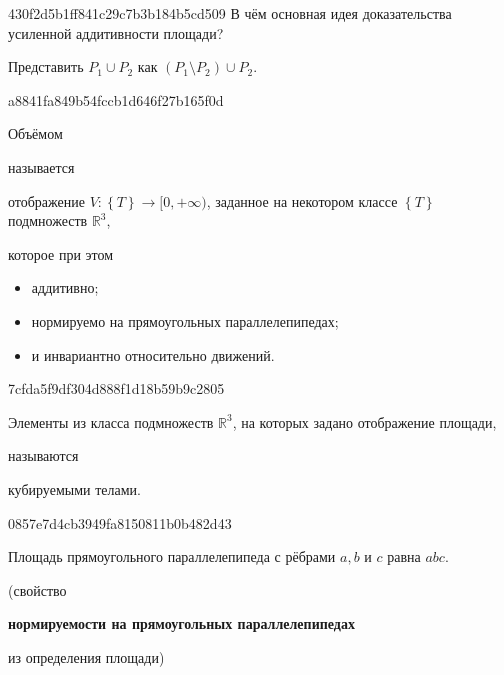 \begin{note}{430f2d5b1ff841c29c7b3b184b5cd509}
    В чём основная идея доказательства усиленной аддитивности площади?

    \begin{cloze}{1}
        Представить \({ P_1 \cup P_2 }\) как \({ (P_1 \setminus P_2) \cup P_2 }\).
    \end{cloze}
\end{note}


\begin{note}{a8841fa849b54fccb1d646f27b165f0d}
    \begin{icloze}{3}Объёмом\end{icloze} называется \begin{icloze}{1}отображение \({ V : \left\{ T \right\} \to [0, +\infty) }\), заданное на некотором классе \({ \left\{ T \right\} }\) подмножеств \({ \mathbb R^3 }\),\end{icloze} которое при этом
    \begin{icloze}{2}
        \begin{itemize}
            \item аддитивно;
            \item нормируемо на прямоугольных параллелепипедах;
            \item и инвариантно относительно движений.
        \end{itemize}
    \end{icloze}
\end{note}

\begin{note}{7cfda5f9df304d888f1d18b59b9c2805}
    \begin{icloze}{2}Элементы из класса подмножеств \({ \mathbb R^3 }\), на которых задано отображение площади,\end{icloze} называются \begin{icloze}{1}кубируемыми телами.\end{icloze}
\end{note}

\begin{note}{0857e7d4cb3949fa8150811b0b482d43}
    \begin{icloze}{1}Площадь прямоугольного параллелепипеда с рёбрами \({ a, b }\) и \({ c }\) равна \({ a b c }\).\end{icloze}

    \begin{center}
        \tiny
        (свойство \begin{icloze}{2}\textbf{нормируемости на прямоугольных параллелепипедах}\end{icloze} из определения площади)
    \end{center}
\end{note}

